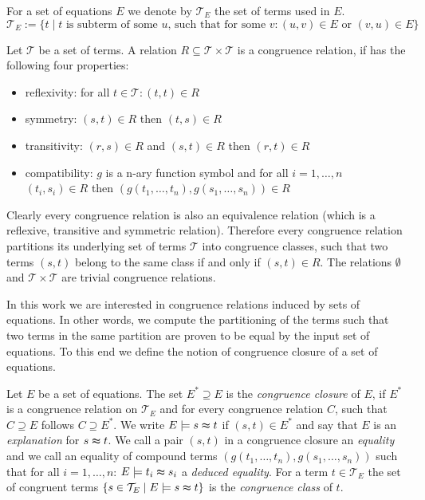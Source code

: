 \noindent For a set of equations $E$ we denote by $\mathcal{T}_E$ the set of terms used in $E$.
$$\mathcal{T}_E := \{t \mid t \text{ is subterm of some } u \text{, such that for some } v: (u,v) \in E \text{ or } (v,u) \in E\}$$

\begin{definition}

Let $\mathcal{T}$ be a set of terms.
A relation $R \subseteq \mathcal{T} \times \mathcal{T}$ is a congruence relation, if has the following four properties:
\begin{itemize}
	\item reflexivity: for all $t \in \mathcal{T}: (t,t) \in R$
	\item symmetry: $(s,t) \in R$ then $(t,s) \in R$
	\item transitivity: $(r,s) \in R$ and $(s,t) \in R$ then $(r,t) \in R$
	\item compatibility: $g$ is a n-ary function symbol and for all $i = 1,\ldots,n$ $(t_i,s_i) \in R$ then $(g(t_1,\ldots,t_n),g(s_1,\ldots,s_n)) \in R$
\end{itemize}

\end{definition}

Clearly every congruence relation is also an equivalence relation (which is a reflexive, transitive and symmetric relation).
Therefore every congruence relation partitions its underlying set of terms $\mathcal{T}$ into congruence classes, such that two terms $(s,t)$ belong to the same class if and only if $(s,t) \in R$.
The relations $\emptyset$ and $\mathcal{T} \times \mathcal{T}$ are trivial congruence relations.

In this work we are interested in congruence relations induced by sets of equations.
In other words, we compute the partitioning of the terms such that two terms in the same partition are proven to be equal by the input set of equations.
To this end we define the notion of congruence closure of a set of equations.

\begin{definition}

Let $E$ be a set of equations.
The set $E^* \supseteq E$ is the \emph{congruence closure} of $E$, 
if $E^*$ is a congruence relation on $\mathcal{T}_E$ and for every congruence relation $C$, such that $C \supseteq E$ follows $C \supseteq E^*$.
We write $E \models s \thickapprox t$ if $(s,t) \in E^*$ and say that $E$ is an \emph{explanation} for $s \thickapprox t$.
We call a pair $(s,t)$ in a congruence closure an \emph{equality} and we call an equality of compound terms $(g(t_1,\ldots,t_n),g(s_1,\ldots,s_n))$ such that for all $i = 1,\ldots,n$: $E \models t_i \thickapprox s_i$ a \emph{deduced equality}.
For a term $t \in \mathcal{T}_E$ the set of congruent terms $\{s \in \mathcal{T}_E \mid E \models s \thickapprox t\}$ is the \emph{congruence class} of $t$.

\end{definition}

